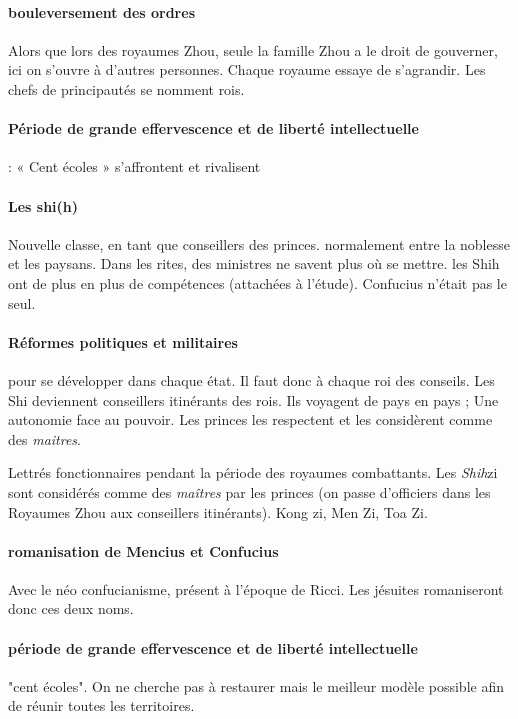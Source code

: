 \paragraph{bouleversement des ordres}
Alors que lors des royaumes Zhou, seule la famille Zhou a le droit de gouverner, ici on s'ouvre à d'autres personnes. Chaque royaume essaye de s'agrandir.  Les chefs de principautés se nomment rois. 

 

\paragraph{Période de grande effervescence et de liberté intellectuelle}  : « Cent
écoles » s’affrontent et rivalisent

\paragraph{Les shi(h)} Nouvelle classe, en tant que conseillers
des princes. normalement entre la noblesse et les paysans. Dans les rites, des ministres ne savent plus où se mettre. les Shih ont de plus en plus de compétences (attachées à l'étude). Confucius n'était pas le seul.
 


\paragraph{Réformes politiques et militaires} pour se développer dans chaque état. Il faut donc à chaque roi des conseils. Les Shi deviennent conseillers itinérants des rois. Ils voyagent de pays en pays ; Une autonomie face au pouvoir. Les princes les respectent et les considèrent comme des \textit{maitres}. 
\begin{Def}[shi(h) - 士 ]
    Lettrés fonctionnaires pendant la période des royaumes combattants.     Les \textit{Shih}{zi} sont considérés comme des \textit{maîtres} par les princes (on passe d'officiers dans les Royaumes Zhou aux conseillers itinérants). Kong zi, Men Zi, Toa Zi. 
\end{Def}
\paragraph{romanisation de Mencius et Confucius} Avec le néo confucianisme, présent à l'époque de Ricci. Les jésuites romaniseront donc ces deux noms.

\paragraph{période de grande effervescence et de liberté intellectuelle} "cent écoles". On ne cherche pas à restaurer mais le meilleur modèle possible afin de réunir toutes les territoires.

